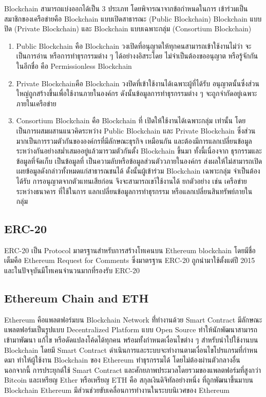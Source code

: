 \documentclass[12pt,oneside,openright,a4paper]{cpe-thai-project}
\begin{document}
\tab Blockchain สามารถแบ่งออกได้เป็น 3 ประเภท โดยพิจารณาจากข้อกำหนดในการ เข้าร่วมเป็นสมาชิกของเครือข่ายคือ Blockchain แบบเปิดสาธารณะ (Public Blockchain) Blockchain แบบปิด (Private Blockchain) และ Blockchain แบบเฉพาะกลุ่ม (Consortium Blockchain) 
\begin{enumerate}[label=\thesubsection.\arabic*,leftmargin=0pt,itemindent=2cm]
\item Public Blockchain คือ Blockchain วงเปิดที่อนุญาตให้ทุกคนสามารถเข้าใช้งานไม่ว่า จะเป็นการอ่าน หรือการทำธุรกรรมต่าง ๆ ได้อย่างงอิสระโดย ไม่จำเป็นต้องขออนุญาต หรือรู้จักกันในอีกชื่อ คือ Permissionless Blockchain
\item Private Blockchainคือ Blockchain วงปิดที่เข้าใช้งานได้เฉพาะผู้ที่ได้รับ อนุญาตนั้นซึ่งส่วนใหญ่ถูกสร้างขึ้นเพื่อใช้งานภายในองค์กร ดังนั้นข้อมูลการทำธุรกรรมต่าง ๆ จะถูกจํากัดอยู่เฉพาะภายในเครือข่าย
\item Consortium Blockchain คือ Blockchain ที่ เปิดให้ใช้งานได้เฉพาะกลุ่ม เท่านั้น โดยเป็นการผสมผสานแนวคิดระหว่าง Public Blockchain และ Private Blockchain ซึ่งส่วนมากเป็นการรวมตัวกันขององค์กรที่มีลักษณะธุรกิจ เหมือนกัน และต้องมีการแลกเปลี่ยนข้อมูลระหว่างกันอย่างสม่ำเสมออยู่แล้วมารวมตัวกันตั้ง Blockchain ขึ้นมา ทั้งนี้เนื่องจาก ธุรกรรมและข้อมูลที่จัดเก็บ เป็นข้อมูลที่ เป็นความลับหรือข้อมูลส่วนตัววภายในองค์กร ส่งผลให้ไม่สามารถเปิดเผยข้อมูลดังกล่าวทั้งหมดแก่สาธารณชนได้ ดั้งนั้นผู้เข้าร่วม Blockchain เฉพาะกลุ่ม จำเป็นต้องได้รับ การอนุญาตจากตัวแทนเสียก่อน จึงจะสามารถเขา้ใช้งานได้ ยกตัวอย่าง เช่น เครือข่ายระหว่างธนาคาร ที่ใช้ในการ แลกเปลี่ยนข้อมูลการทำธุรกรรม หรือแลกเปลี่ยนสินทรัพย์ภายในกลุ่ม
\end{enumerate}
\subsection{ERC-20}
\tab ERC-20 เป็น Protocol มาตรฐานสําหรับการสร้างโทเคนบน Ethereum blockchain โดยมีชื่อเต็มคือ Ethereum Request for Comments ซึ่งมาตรฐาน ERC-20 ถูกนํามาใช้ตั้งแต่ปี 2015 และในปัจจุบันมีโทเคนจํานวนมากที่รองรับ ERC-20

\subsection{Ethereum Chain and ETH}
\tab Ethereum คือแพลตฟอร์มบน Blockchain Network ที่่ทํางานด้วย Smart Contract มีลักษณะแพลตฟอร์มเป็นรูปแบบ Decentralized Platform แบบ Open Source ทําให้นักพัฒนาสามารถเข้ามาพัฒนา แก้ไข หรือดัดแปลงโค้ดได้ทุกคน พร้อมทั้งกําหนดเงื่อนไขต่าง ๆ สําหรับนําไปใช้งานบน Blockchain โดยมี Smart Contract ดําเนินการและระบบจะทํางานตามเงื่อนไขโปรแกรมที่กําหนดมา ทําให้ผู้ใช้งาน Blockchain ของ Ethereum ทําธุรกรรมได้ โดยไม่ต้องผ่านตัวกลางอื่น นอกจากนี้ การประยุกต์ใช้ Smart Contract และศักยภาพประมวลโดยรวมของแพลตฟอร์มที่สูงกว่า Bitcoin และเหรียญ Ether หรือเหรียญ ETH คือ สกุลเงินดิจิทัลอย่างหนึ่ง ที่ถูกพัฒนาขึ้นมาบน Blockchain Ethereum มีส่วนช่วยขับเคลื่อนการทํางานในระบบนิเวศของ Ethereum
\end{document}
